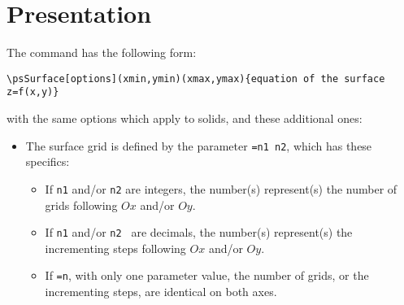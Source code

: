\section{Presentation}

The command has the following form:
\begin{verbatim}
\psSurface[options](xmin,ymin)(xmax,ymax){equation of the surface z=f(x,y)}
\end{verbatim}
 with the same options which apply to solids, and these additional
ones:
\begin{itemize}
  \item The surface grid is defined by the parameter
    \texttt{=n1 n2}, which has these specifics:

\begin{minipage}{1\linewidth}
  \begin{itemize}
    \item If \texttt{n1} and/or  \texttt{n2} are integers, the
      number(s) represent(s) the number of grids following $Ox$ and/or
      $Oy$.
    \item If \texttt{n1} and/or  \texttt{n2 } are decimals, the
      number(s) represent(s) the incrementing steps following $Ox$
      and/or $Oy$.
    \item If \texttt{=n}, with only one parameter value,
      the number of grids, or the incrementing steps,
      are identical on both axes.
  \end{itemize}
\end{minipage}


\end{itemize}
